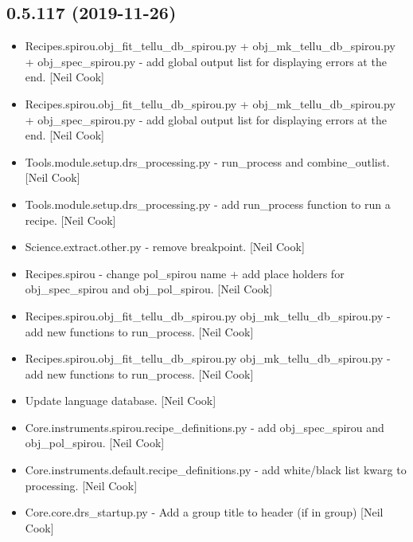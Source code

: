 \documentclass[a4paper,10pt,english]{report}
\begin{document}
\subsection{0.5.117 (2019-11-26)}
\label{\detokenize{misc/changelog:id24}}\begin{itemize}
\item {} 
Recipes.spirou.obj\_fit\_tellu\_db\_spirou.py + obj\_mk\_tellu\_db\_spirou.py
+ obj\_spec\_spirou.py - add global output list for displaying errors at
the end. {[}Neil Cook{]}

\item {} 
Recipes.spirou.obj\_fit\_tellu\_db\_spirou.py + obj\_mk\_tellu\_db\_spirou.py
+ obj\_spec\_spirou.py - add global output list for displaying errors at
the end. {[}Neil Cook{]}

\item {} 
Tools.module.setup.drs\_processing.py - run\_process and
combine\_outlist. {[}Neil Cook{]}

\item {} 
Tools.module.setup.drs\_processing.py - add run\_process function to run
a recipe. {[}Neil Cook{]}

\item {} 
Science.extract.other.py - remove breakpoint. {[}Neil Cook{]}

\item {} 
Recipes.spirou - change pol\_spirou name + add place holders for
obj\_spec\_spirou and obj\_pol\_spirou. {[}Neil Cook{]}

\item {} 
Recipes.spirou.obj\_fit\_tellu\_db\_spirou.py obj\_mk\_tellu\_db\_spirou.py -
add new functions to run\_process. {[}Neil Cook{]}

\item {} 
Recipes.spirou.obj\_fit\_tellu\_db\_spirou.py obj\_mk\_tellu\_db\_spirou.py -
add new functions to run\_process. {[}Neil Cook{]}

\item {} 
Update language database. {[}Neil Cook{]}

\item {} 
Core.instruments.spirou.recipe\_definitions.py - add obj\_spec\_spirou
and obj\_pol\_spirou. {[}Neil Cook{]}

\item {} 
Core.instruments.default.recipe\_definitions.py - add white/black list
kwarg to processing. {[}Neil Cook{]}

\item {} 
Core.core.drs\_startup.py - Add a group title to header (if in group)
{[}Neil Cook{]}


\end{itemize}
\end{document}
